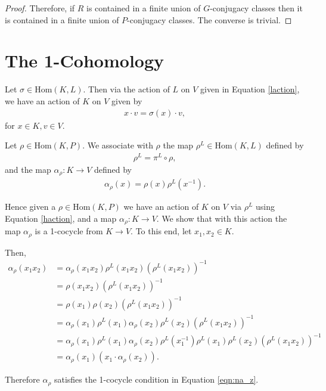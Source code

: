\begin{proof}
	Therefore, if $R$ is contained in a finite union of $G$-conjugacy classes then it is contained in a finite union of $P$-conjugacy classes. The converse is trivial.
\end{proof}


\section{The 1-Cohomology}
Let $\sigma \in \mathrm{Hom}(K, L)$. Then via the action of $L$ on $V$ given in Equation \ref{laction}, we have an action of $K$ on $V$ given by
\begin{align} \label{haction} x \cdot v = \sigma(x) \cdot v, \end{align}
for $x \in K, v \in V$.


\begin{definition} Let $\rho \in \mathrm{Hom}(K, P)$. We associate with $\rho$ the map $\rho^L \in \mathrm{Hom}(K, L)$ defined by
\begin{align*} \rho^L = \pi^L \circ \rho, \end{align*}
and the map $\alpha_\rho: K \rightarrow V$ defined by
\begin{align} \alpha_\rho(x) = \rho(x)\rho^L(x^{-1}). \end{align}
\end{definition}

Hence given a $\rho \in \mathrm{Hom}(K, P)$ we have an action of $K$ on $V$ via $\rho^L$ using Equation \ref{haction}, and a map $\alpha_\rho:K \rightarrow V$. We show that with this action the map $\alpha_\rho$ is a 1-cocycle from $K \rightarrow V$. To this end, let $x_1, x_2 \in K$.

Then,
\begin{align*} \alpha_\rho(x_1x_2) &= \alpha_\rho(x_1x_2) \rho^L(x_1x_2) \left(\rho^L(x_1x_2)\right)^{-1} \\
	&= \rho(x_1x_2) \left(\rho^L(x_1x_2)\right)^{-1} \\
	&= \rho(x_1) \rho(x_2) \left(\rho^L(x_1x_2)\right)^{-1} \\
	&= \alpha_\rho(x_1) \rho^L(x_1) \alpha_\rho(x_2) \rho^L(x_2) \left(\rho^L(x_1x_2)\right)^{-1} \\
	&= \alpha_\rho(x_1) \rho^L(x_1) \alpha_\rho(x_2) \rho^L(x_1^{-1}) \rho^L(x_1) \rho^L(x_2) \left(\rho^L(x_1x_2)\right)^{-1} \\
	&= \alpha_\rho(x_1) \left(x_1 \cdot \alpha_\rho(x_2)\right). 
\end{align*}

Therefore $\alpha_\rho$ satisfies the 1-cocycle condition in Equation \ref{eqn:na_z}.

